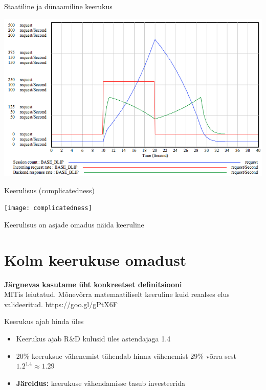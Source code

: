 \documentclass{beamer}
\begin{document}
\begin{frame}{Staatiline ja dünaamiline keerukus}
	\begin{center}
		\includegraphics[width=\textwidth]{rr_blip.png}
	\end{center}

\end{frame}



\begin{frame}{Keerulisus (complicatedness)}
	\begin{center}
		\texttt{[image: complicatedness]}


Keerulisus on asjade omadus näida keeruline

	\end{center}
\end{frame}

\section{Kolm keerukuse omadust}
\begin{frame}[fragile]
	\begin{center}
		\LARGE{\textbf{Järgnevas kasutame üht konkreetset definitsiooni}}
		\\[4cm]
		\small{MITis leiutatud. Mõnevõrra matemaatiliselt keeruline kuid reaalses elus valideeritud. https://goo.gl/gPtX6F}
	\end{center}
\end{frame}

\begin{frame}{Keerukus ajab hinda üles}
	\begin{itemize}
		\item Keerukus ajab R\&D kulusid üles astendajaga 1.4
		\item 20\% keeruksue vähenemist tähendab hinna vähenemist 29\% võrra sest $1.2^{1.4}\approx1.29$
		\item \textbf{Järeldus:} keerukuse vähendamisse tasub investeerida
	\end{itemize}
\end{frame}
\end{document}
